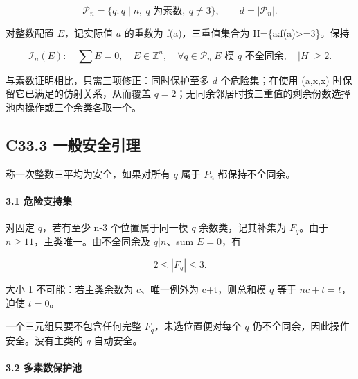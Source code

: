 \documentclass[11pt,a4paper]{article}
\theoremstyle{definition}
\numberwithin{equation}{section}
\begin{document}
\[
\mathcal P_n=\{q:q\mid n,\ q\text{ 为素数},\ q\ne3\},
\qquad d=|\mathcal P_n|.
\]

{对整数配置} {\ensuremath{E}，记实际值} {\ensuremath{a}} {的重数为} {f(a)，三重值集合为} {H=\{a:f(a)\textgreater=3\}。保持}

\[
\mathcal I_n(E):\quad \sum E=0,\quad E\in\mathbb Z^n,
\quad \forall q\in\mathcal P_n\ E\text{ 模 }q\text{ 不全同余},
\quad |H|\ge2.
\]

{与素数证明相比，只需三项修正：同时保护至多} {\ensuremath{d}} {个危险集；在使用} {(a,x,x)} {时保留它已满足的仿射关系，从而覆盖} {\ensuremath{q=2}；无同余邻居时按三重值的剩余份数选择池内操作或三个余类各取一个。}

\subsection*{\texorpdfstring{{C33.3} {一般安全引理}}{C33.3 一般安全引理}}\label{C33-h213}

{称一次整数三平均为安全，如果对所有} {\ensuremath{q}} {属于} {\ensuremath{P_{n}}} {都保持不全同余。}

\paragraph*{\texorpdfstring{{3.1} {危险支持集}}{3.1 危险支持集}}\label{C33-h214}

{对固定} {\ensuremath{q}，若有至少} {n-3} {个位置属于同一模} {\ensuremath{q}} {余数类，记其补集为} {\ensuremath{F_{q}}。由于} {\ensuremath{n\ge 11}，主类唯一。由不全同余及} {\ensuremath{q|n}、sum} {\ensuremath{E=0}，有}

\[
2\le |F_q|\le3.
\]

{大小} {1} {不可能：若主类余数为} {\ensuremath{c}、唯一例外为} {c+t，则总和模} {\ensuremath{q}} {等于} {\ensuremath{nc+t=t}，迫使} {\ensuremath{t=0}。}

{一个三元组只要不包含任何完整} {\ensuremath{F_{q}}，未选位置便对每个} {\ensuremath{q}} {仍不全同余，因此操作安全。没有主类的} {\ensuremath{q}} {自动安全。}

\paragraph*{\texorpdfstring{{3.2} {多素数保护池}}{3.2 多素数保护池}}\label{C33-h215}
\end{document}
